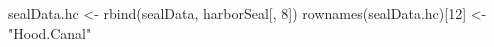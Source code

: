 \begin{Schunk}
\begin{Sinput}
 sealData.hc <- rbind(sealData, harborSeal[, 8])
 rownames(sealData.hc)[12] <- "Hood.Canal"
\end{Sinput}
\end{Schunk}
